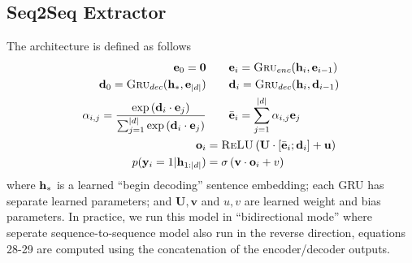 \begin{appendices}
\subsection{Seq2Seq Extractor}
The architecture is defined as follows
\begin{align}
    \mathbf{e}_0 = \textbf{0}& \quad \quad   \mathbf{e}_i = \textsc{Gru}_{enc}(\mathbf{h}_i, \mathbf{e}_{i-1}) \\
    \mathbf{d}_0 = \textsc{Gru}_{dec}(\mathbf{h}_*, \mathbf{e}_{| d |}) &\quad\quad
\mathbf{d}_i = \textsc{Gru}_{dec}(\mathbf{h}_{i}, \mathbf{d}_{i-1}) \label{eq:cl1} \\
 \alpha_{i,j} = 
   \frac{\exp \left(\mathbf{d}_i \cdot \mathbf{e}_j \right)}{
   \sum_{j=1}^{| d |}\exp\left(\mathbf{d}_i \cdot \mathbf{e}_j\right)}
& \quad\quad \bar{\mathbf{e}}_i = \sum_{j=1}^{| d |} \alpha_{i,j} \mathbf{e}_j \\
\mathbf{o}_i &= \textsc{ReLU}\left(\mathbf{U} \cdot [\bar{\mathbf{e}}_i; \mathbf{d}_i] + \mathbf{u} \right)\\
p(\mathbf{y}_i=1|\mathbf{h}_{1:| d |}) &= \sigma\left(\mathbf{v}\cdot \mathbf{o}_i + v  \right) 
\end{align}
where $\mathbf{h}_*$ is a learned ``begin decoding'' sentence embedding;
each GRU has separate learned 
parameters; and $\mathbf{U}, \mathbf{v}$ and $u, v$ are learned weight and 
bias parameters. In practice, we run this model in ``bidirectional mode'' 
where seperate sequence-to-sequence model also run in the reverse direction,
equations 28-29 are computed using the concatenation of the encoder/decoder
outputs. 



\end{appendices}
